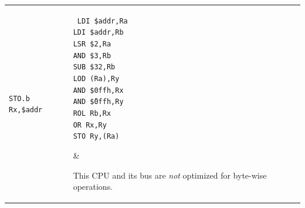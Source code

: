 \documentclass{gqtekspec}
\begin{document}
\begin{table}\begin{center}
\begin{tabular}{p{1.4in}p{1.5in}p{3in}}\\\hline
{\tt STO.b Rx,\$addr}
	& \parbox[t]{1.5in}{\tt %
	LDI \$addr,Ra \\
	LDI \$addr,Rb \\
	LSR \$2,Ra \\
	AND \$3,Rb \\
	SUB \$32,Rb \\
	LOD (Ra),Ry \\
	AND \$0ffh,Rx \\
	AND \~\$0ffh,Ry \\
	ROL Rb,Rx \\
	OR Rx,Ry \\
	STO Ry,(Ra) }
	& \parbox[t]{3in}{This CPU and its bus are {\em not} optimized
	for byte-wise operations.
	
}
\end{tabular}
\end{center}
\end{table}
\end{document}
